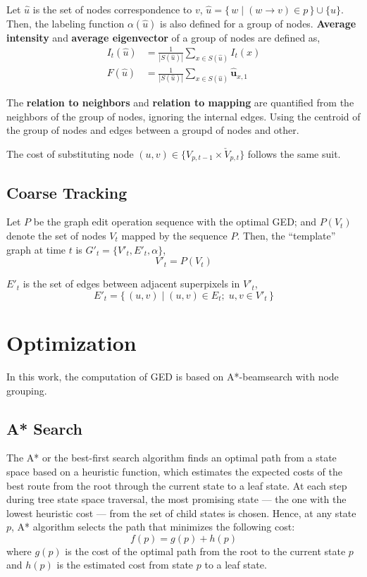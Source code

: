 \documentclass[10pt,letterpaper]{article}
\begin{document}
Let $\hat{u}$ is the set of nodes correspondence to $v$, $\hat{u} = \{\, w \mid (w \rightarrow v) \in p \,\} \cup \{u\}$. Then, the labeling function $\alpha(\hat{u})$ is also defined for a group of nodes. \textbf{Average intensity} and \textbf{average eigenvector} of a group of nodes are defined as,
\begin{equation}
\begin{aligned}
I_t(\hat{u}) & = \frac{1}{|S(\hat{u})|}\sum_{x \in S(\hat{u})} I_t(x) \\
F(\hat{u}) & = \frac{1}{|S(\hat{u})|}\sum_{x \in S(\hat{u})} \hat{\textbf{u}}_{x,1}
\end{aligned}
\end{equation} 

The \textbf{relation to neighbors} and \textbf{relation to mapping} are quantified from the neighbors of the group of nodes, ignoring the internal edges. Using the centroid of the group of nodes and edges between a groupd of nodes and other.

The cost of substituting node $(u,v) \in \{ V_{p,t-1} \times \check{V}_{p,t} \}$ follows the same suit.


\subsection{Coarse Tracking}
Let $P$ be the graph edit operation sequence with the optimal GED; and $P(V_t)$ denote the set of nodes $V_t$ mapped by the sequence $P$. Then, the ``template'' graph at time $t$ is $G'_t =  \{V'_t, E'_t, \alpha \}$,
\begin{equation}
V'_t = P(V_t)
\end{equation}

$E'_t$ is the set of edges between adjacent superpixels in $V'_t$, 
\begin{equation}
E'_t = \{\, (u, v) \mid (u, v) \in E_t ;\; u, v \in V'_t \,\}
\end{equation}

\section{Optimization}
In this work, the computation of GED is based on A*-beamsearch \cite{neuhaus2006} with node grouping.

\subsection{A* Search}
The A* or the best-first search algorithm finds an optimal path from a state space based on a heuristic function, which estimates the expected costs of the best route from the root through the current state to a leaf state. At each step during tree state space traversal, the most promising state --- the one with the lowest heuristic cost --- from the set of child states is chosen. Hence, at any state $p$, A* algorithm selects the path that minimizes the following cost:
\begin{equation} \label{eq:a*}
f(p) = g(p) + h(p)
\end{equation}
where $g(p)$ is the cost of the optimal path from the root to the current state $p$ and $h(p)$ is the estimated cost from state $p$ to a leaf state. \cite{hart1968}
\end{document}
